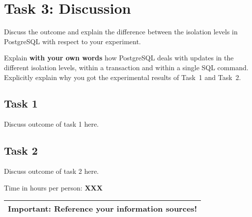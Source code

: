 \documentclass[11pt]{scrartcl}
\begin{document}
\medskip

\section*{Task 3: Discussion}

Discuss the outcome and explain the difference between the isolation
levels in PostgreSQL with respect to your experiment.

Explain {\bf with your own words} how PostgreSQL deals with updates in
the different isolation levels, within a transaction and within a
single SQL command. Explicitly explain why you got the experimental
results of Task~1 and Task~2.

\subsection*{Task 1}

Discuss outcome of task 1 here.

\subsection*{Task 2}

Discuss outcome of task 2 here.

\bigskip

\noindent Time in hours per person: {\bf XXX}

\bigskip

\begin{center}
  \begin{tabular}{c}
    \hline
    {\bf Important:} Reference your information sources!
    \\\hline
  \end{tabular}
\end{center}
\end{document}
